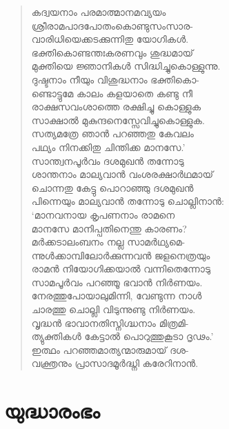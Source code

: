 \begin{verse}
കദ്വയനാം പരമാത്മാനമവ്യയം\\
ശ്രീരാമപാദപോതംകൊണ്ടുസംസാര-\\
വാരിധിയെക്കടക്കുന്നിതു യോഗികള്‍.\\
ഭക്തികൊണ്ടന്തഃകരണവും ശുദ്ധമായ്\\
മുക്തിയെ ജ്ഞാനികള്‍ സിദ്ധിച്ചുകൊള്ളുന്നു.\\
ദുഷ്ടനാം നീയും വിശുദ്ധനാം ഭക്തികൊ-\\
ണ്ടൊട്ടുമേ കാലം കളയാതെ കണ്ടു നീ\\
രാക്ഷസവംശാത്തെ രക്ഷിച്ചു കൊള്ളുക\\
സാക്ഷാല്‍ മുകുന്ദനെസ്സേവിച്ചുകൊള്ളുക.\\
സത്യമത്രേ ഞാന്‍ പറഞ്ഞതു കേവലം\\
പഥ്യം നിനക്കിതു ചിന്തിക്ക മാനസേ.’\\
സാന്ത്വനപൂര്‍വം ദശമുഖന്‍ തന്നോടു\\
ശാന്തനാം മാല്യവാന്‍ വംശരക്ഷാര്‍ഥമായ്\\
ചൊന്നതു കേട്ടു പൊറാഞ്ഞു ദശമുഖന്‍\\
പിന്നെയും മാല്യവാന്‍ തന്നോടു ചൊല്ലിനാന്‍:\\
‘മാനവനായ കൃപണനാം രാമനെ\\
മാനസേ മാനിപ്പതിനെന്തു കാരണം?\\
മര്‍ക്കടാലംബനം നല്ല സാമര്‍ഥ്യമെ-\\
ന്നുള്‍ക്കാമ്പിലോര്‍ക്കുന്നവന്‍ ജളനെത്രയും\\
രാമന്‍ നിയോഗിക്കയാല്‍ വന്നിതെന്നോടു\\
സാമപൂര്‍വം പറഞ്ഞൂ ഭവാന്‍ നിര്‍ണയം.\\
നേരത്തുപോയാലുമിന്നി, വേണ്ടുന്ന നാള്‍\\
ചാരത്തു ചൊല്ലി വിടുന്നുണ്ടു നിര്‍ണയം.\\
വൃദ്ധന്‍ ഭാവാനതിസ്നിഗ്ദ്ധനാം മിത്രമി-\\
ത്യുക്തികള്‍ കേട്ടാല്‍ പൊറുത്തുകൂടാ ദൃഢം.’\\
ഇത്ഥം പറഞ്ഞമാത്യന്മാരുമായ് ദശ-\\
വക്ത്രനും പ്രാസാദമൂര്‍ദ്ധ്നി കരേറിനാന്‍.
\end{verse}


\section{യുദ്ധാരംഭം}

